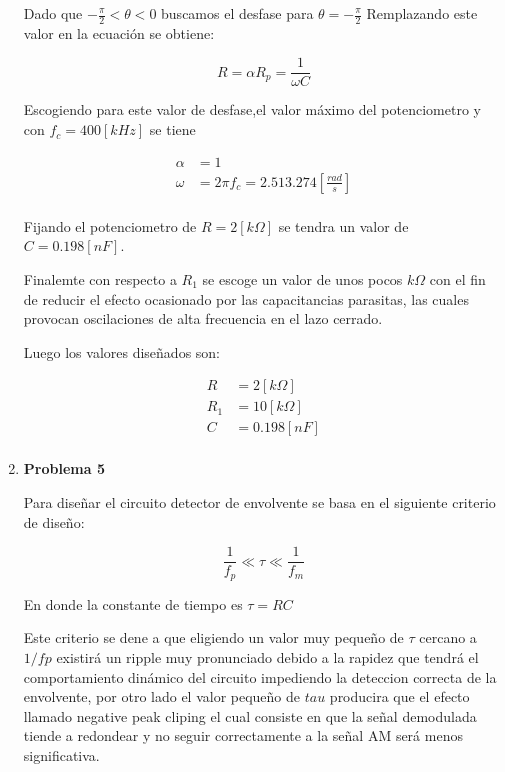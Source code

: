 \documentclass[letterpaper, titlepage]{article}
\begin{document}
\begin{enumerate}
Dado que $- \frac{\pi}{2}< \theta < 0$ 	buscamos el desfase para $\theta =- \frac{\pi}{2}$ Remplazando este valor en la ecuación se obtiene:

\begin{equation}
R = \alpha R_{p} = \frac{1}{\omega C}
\end{equation}

Escogiendo para este valor de desfase,el valor máximo del potenciometro y con $f_{c}= 400[kHz]$ se tiene

\begin{align*}
\alpha & = 1 \\
\omega & = 2 \pi f_{c} = 2.513.274 [\frac{rad}{s}] \\
\end{align*}

Fijando el potenciometro de $ R=2[k \Omega ] $ se tendra un valor de $ C = 0.198[nF] $.

Finalemte con respecto a $ R_{1} $ se escoge un valor de unos pocos $ k \Omega $ con el fin de reducir el efecto ocasionado por las capacitancias parasitas, las cuales provocan oscilaciones de alta frecuencia en el lazo cerrado. 

Luego los valores diseñados son:

\begin{align*}
R & = 2[k \Omega] \\
R_{1} & = 10[k \Omega] \\
C & = 0.198[nF] \\
\end{align*}

\newpage

\item \textbf{Problema 5}

Para diseñar el circuito detector de envolvente se basa en el siguiente criterio de diseño:

\begin{equation}
 \frac{1}{f_{p}} \ll \tau \ll \frac{1}{f_{m}}
\end{equation}

En donde la constante de tiempo es $\tau = RC$

Este criterio se dene a que eligiendo un valor muy pequeño de $\tau$ cercano a $1/fp$ existirá un ripple muy pronunciado debido a la rapidez que tendrá el comportamiento dinámico del circuito impediendo la deteccion correcta de la envolvente, por otro lado el valor pequeño de $tau$ producira que el efecto llamado negative peak cliping el cual consiste en que la señal demodulada tiende a redondear y no seguir correctamente a la señal AM será menos significativa.


\end{enumerate}
\end{document}
